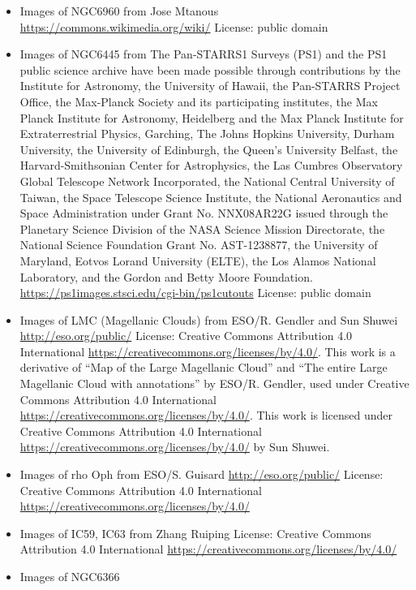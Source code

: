 \begin{itemize}
	 \url{https://commons.wikimedia.org/wiki/}
	 License: Creative Commons Attribution-Share Alike 3.0 Unported \url{https://creativecommons.org/licenses/by-sa/3.0/}
\item Images of NGC6960
	 from Jose Mtanous
	 \url{https://commons.wikimedia.org/wiki/}
	 License: public domain
\item Images of NGC6445
	 from The Pan-STARRS1 Surveys (PS1) and the PS1 public science archive have been made possible through contributions by the Institute for Astronomy, the University of Hawaii, the Pan-STARRS Project Office, the Max-Planck Society and its participating institutes, the Max Planck Institute for Astronomy, Heidelberg and the Max Planck Institute for Extraterrestrial Physics, Garching, The Johns Hopkins University, Durham University, the University of Edinburgh, the Queen's University Belfast, the Harvard-Smithsonian Center for Astrophysics, the Las Cumbres Observatory Global Telescope Network Incorporated, the National Central University of Taiwan, the Space Telescope Science Institute, the National Aeronautics and Space Administration under Grant No. NNX08AR22G issued through the Planetary Science Division of the NASA Science Mission Directorate, the National Science Foundation Grant No. AST-1238877, the University of Maryland, Eotvos Lorand University (ELTE), the Los Alamos National Laboratory, and the Gordon and Betty Moore Foundation.
	 \url{https://ps1images.stsci.edu/cgi-bin/ps1cutouts}
	 License: public domain
\item Images of LMC (Magellanic Clouds)
	 from ESO/R. Gendler and Sun Shuwei
	 \url{http://eso.org/public/}
	 License: Creative Commons Attribution 4.0 International \url{https://creativecommons.org/licenses/by/4.0/}. This work is a derivative of ``Map of the Large Magellanic Cloud'' and ``The entire Large Magellanic Cloud with annotations'' by ESO/R. Gendler, used under Creative Commons Attribution 4.0 International \url{https://creativecommons.org/licenses/by/4.0/}. This work is licensed under Creative Commons Attribution 4.0 International \url{https://creativecommons.org/licenses/by/4.0/} by Sun Shuwei.
\item Images of rho Oph
	 from ESO/S. Guisard
	 \url{http://eso.org/public/}
	 License: Creative Commons Attribution 4.0 International \url{https://creativecommons.org/licenses/by/4.0/} 
\item Images of IC59, IC63
	 from Zhang Ruiping
	 License: Creative Commons Attribution 4.0 International \url{https://creativecommons.org/licenses/by/4.0/} 
\item Images of NGC6366

\end{itemize}
